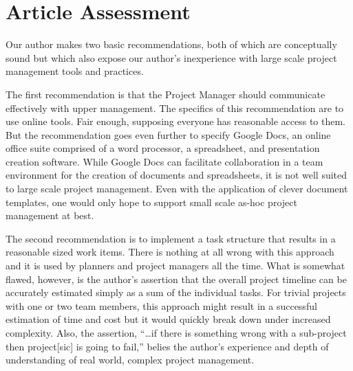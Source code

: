 \documentclass[letterpaper,12pt]{article}
\begin{document}
\section{Article Assessment}

Our author makes two basic recommendations, both of which are conceptually sound but which also expose our author's inexperience with large scale project management tools and practices.  

The first recommendation is that the Project Manager should communicate effectively with upper management.  The specifics of this recommendation are to use online tools.  Fair enough, supposing everyone has reasonable access to them.  But the recommendation goes even further to specify Google Docs, an online office suite comprised of a word processor, a spreadsheet, and presentation creation software.  While Google Docs can facilitate collaboration in a team environment for the creation of documents and spreadsheets, it is not well suited to large scale project management.  Even with the application of clever document templates, one would only hope to support small scale as-hoc project management at best.

The second recommendation is to implement a task structure that results in a reasonable sized work items.  There is nothing at all wrong with this approach and it is used by planners and project managers all the time.  What is somewhat flawed, however, is the author's assertion that the overall project timeline can be accurately estimated simply as a sum of the individual tasks.  For trivial projects with one or two team members, this approach might result in a successful estimation of time and cost but it would quickly break down under increased complexity.  Also, the assertion, ``\dots if there is something wrong with a sub-project then project[sic] is going to fail,'' belies the author's experience and depth of understanding of real world, complex project management.
\end{document}
